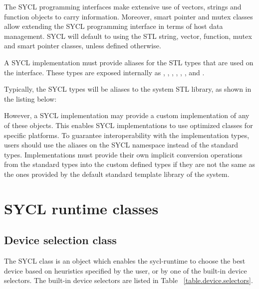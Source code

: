 The SYCL programming interfaces make extensive use of vectors, strings
and function objects to carry information. Moreover, smart pointer
and mutex classes allow extending the SYCL programming interface in
terms of host data management. SYCL will default to using the STL
string, vector, function, mutex and smart pointer classes, unless
defined otherwise.

A SYCL implementation must provide aliases for the STL types that 
are used on the interface. 
These types are exposed internally as
,
,
,
,
,
,
 and
.

Typically, the SYCL types will be aliases to the system 
STL library, as shown in the listing below:



However, a SYCL implementation may provide a custom implementation 
of any of these objects. 
This enables SYCL implementations to use optimized classes for specific
platforms.
To guarantee interoperability with the implementation types, users should
use the aliases on the SYCL namespace instead of the standard types.
Implementations must provide their own implicit conversion operations from the 
standard types into the custom defined types if they are not the same
as the ones provided by the default standard template library of the system.

\section{SYCL runtime classes}


\subsection{Device selection class}
\label{sec:device-selector}

The SYCL  class is an
object which enables the \gls{sycl-runtime} to choose the best device based
on heuristics specified by the user, or by one of the built-in device
selectors. The built-in device selectors are listed in Table
~\ref{table.device.selectors}.

